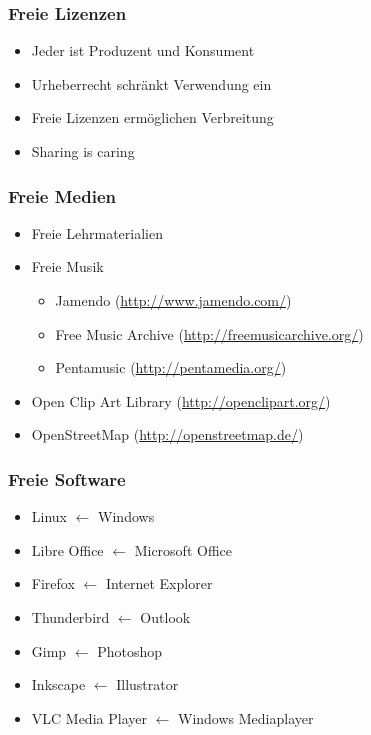 \documentclass[14pt,handout]{beamer}
\newcommand{\ben}[1]{\pdfcomment[author=Ben]{#1}}
\begin{document}
\begin{frame}
    \frametitle{Freie Lizenzen}
    \begin{itemize}
        \item<2-> Jeder ist Produzent und Konsument
        \item<3-> Urheberrecht schränkt Verwendung ein
        \item<4-> Freie Lizenzen ermöglichen Verbreitung
        \item<5-> Sharing is caring
    \end{itemize}
\end{frame}

\begin{frame}
    \frametitle{Freie Medien}
    \begin{itemize}
        \item<2-> Freie Lehrmaterialien
        \item<3-> Freie Musik
            \begin{itemize}
                \item Jamendo (\url{http://www.jamendo.com/})
                \item Free Music Archive (\url{http://freemusicarchive.org/})
                \item Pentamusic (\url{http://pentamedia.org/})
            \end{itemize}
        \item<4-> Open Clip Art Library (\url{http://openclipart.org/})
        \item<5-> OpenStreetMap (\url{http://openstreetmap.de/})
    \end{itemize}
\end{frame}

\begin{frame}
    \frametitle{Freie Software}
    \begin{itemize}
        \item Linux $ \gets $ Windows
        \item Libre Office $ \gets $ Microsoft Office
        \item Firefox $ \gets $ Internet Explorer
        \item Thunderbird $ \gets $ Outlook
        \item Gimp $ \gets $ Photoshop
        \item Inkscape $ \gets $ Illustrator
        \item VLC Media Player $ \gets $ Windows Mediaplayer
    \end{itemize}
\end{frame}
\end{document}
